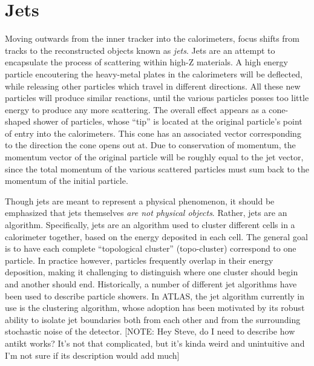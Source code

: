     \section{Jets}
        Moving outwards from the inner tracker into the calorimeters, focus shifts from tracks to the reconstructed objects known as \textit{jets}.
        Jets are an attempt to encapsulate the process of scattering within high-Z materials.
        A high energy particle encoutering the heavy-metal plates in the calorimeters will be deflected,
            while releasing other particles which travel in different directions.
        All these new particles will produce similar reactions, until the various particles posses too little energy to produce any more scattering.
        The overall effect appears as a cone-shaped shower of particles,
            whose ``tip'' is located at the original particle's point of entry into the calorimeters.
        This cone has an associated vector corresponding to the direction the cone opens out at.
        Due to conservation of momentum, the momentum vector of the original particle will be roughly equal to the jet vector,
            since the total momentum of the various scattered particles must sum back to the momentum of the initial particle.

        Though jets are meant to represent a physical phenomenon,
            it should be emphasized that jets themselves \textit{are not physical objects}.
        Rather, jets are an algorithm.
        Specifically, jets are an algorithm used to cluster different cells in a calorimeter together,
            based on the energy deposited in each cell.
        The general goal is to have each complete ``topological cluster'' (topo-cluster) correspond to one particle.
        In practice however, particles frequently overlap in their energy deposition,
            making it challenging to distinguish where one cluster should begin and another should end.
        Historically, a number of different jet algorithms have been used to describe particle showers.
        In ATLAS, the jet algorithm currently in use is the \textit{\antikt} clustering algorithm\cite{anti_kt},
            whose adoption has been motivated by its robust ability to isolate jet boundaries both from each other
            and from the surrounding stochastic noise of the detector.
        [NOTE: Hey Steve, do I need to describe how antikt works?
        It's not that complicated, but it's kinda weird and unintuitive and I'm not sure if its description would add much]


